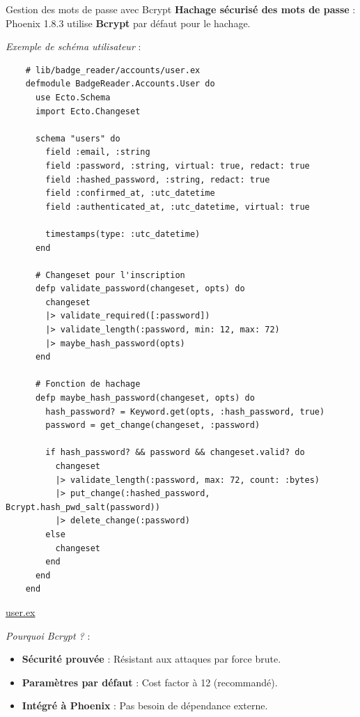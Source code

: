 \begin{for_you}{Gestion des mots de passe avec Bcrypt}
    \textbf{Hachage sécurisé des mots de passe} :
    Phoenix 1.8.3 utilise \textbf{Bcrypt} par défaut pour le hachage.
    \newline

    \textit{Exemple de schéma utilisateur} :
    \begin{lstlisting}
    # lib/badge_reader/accounts/user.ex
    defmodule BadgeReader.Accounts.User do
      use Ecto.Schema
      import Ecto.Changeset

      schema "users" do
        field :email, :string
        field :password, :string, virtual: true, redact: true
        field :hashed_password, :string, redact: true
        field :confirmed_at, :utc_datetime
        field :authenticated_at, :utc_datetime, virtual: true

        timestamps(type: :utc_datetime)
      end

      # Changeset pour l'inscription
      defp validate_password(changeset, opts) do
        changeset
        |> validate_required([:password])
        |> validate_length(:password, min: 12, max: 72)
        |> maybe_hash_password(opts)
      end

      # Fonction de hachage
      defp maybe_hash_password(changeset, opts) do
        hash_password? = Keyword.get(opts, :hash_password, true)
        password = get_change(changeset, :password)

        if hash_password? && password && changeset.valid? do
          changeset
          |> validate_length(:password, max: 72, count: :bytes)
          |> put_change(:hashed_password, Bcrypt.hash_pwd_salt(password))
          |> delete_change(:password)
        else
          changeset
        end
      end
    end
    \end{lstlisting}

    \href{https://github.com/Theoden-bernard/badge_reader_project/blob/develop/badge_reader/lib/badge_reader/accounts/user.ex}{user.ex \newline}

    \textit{Pourquoi Bcrypt ?} :
    \begin{itemize}
        \item \textbf{Sécurité prouvée} : Résistant aux attaques par force brute.
        \item \textbf{Paramètres par défaut} : Cost factor à 12 (recommandé).
        \item \textbf{Intégré à Phoenix} : Pas besoin de dépendance externe.
    \end{itemize}
\end{for_you}

